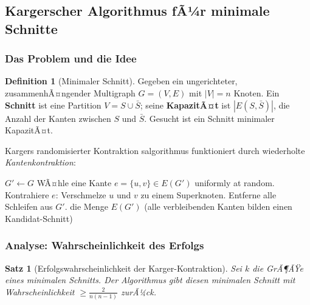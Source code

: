 ﻿\documentclass[12pt,a4paper]{article}
\theoremstyle{definition}
\newtheorem{definition}{Definition}[section]
\theoremstyle{plain}
\newtheorem{satz}{Satz}[section]
\theoremstyle{remark}
\begin{document}
\subsection{Kargerscher Algorithmus fÃ¼r minimale Schnitte}
\label{subsec:karger}

\subsubsection{Das Problem und die Idee}

\begin{definition}[Minimaler Schnitt]\label{def:mincut}
  Gegeben ein ungerichteter, zusammenhÃ¤ngender Multigraph $G=(V,E)$ mit
  $|V|=n$ Knoten. Ein \textbf{Schnitt} ist eine Partition $V = S \cup \bar{S}$;
  seine \textbf{KapazitÃ¤t} ist $|E(S,\bar{S})|$, die Anzahl der Kanten
  zwischen $S$ und $\bar{S}$. Gesucht ist ein Schnitt minimaler KapazitÃ¤t.
\end{definition}

Kargers randomisierter Kontraktion salgorithmus \cite{karger1993global}
funktioniert durch wiederholte \emph{Kantenkontraktion}:

\begin{algorithm}[H]
  \caption{Karger-Kontraktion}
  \label{alg:karger}
  \begin{algorithmic}[1]
    \State $G' \gets G$
      \State WÃ¤hle eine Kante $e = \{u,v\} \in E(G')$ uniformly at random.
      \State Kontrahiere $e$: Verschmelze $u$ und $v$ zu einem Superknoten.
      \State Entferne alle Schleifen aus $G'$.
    \EndWhile
    \State \Return die Menge $E(G')$ (alle verbleibenden Kanten bilden
           einen Kandidat-Schnitt)
  \end{algorithmic}
\end{algorithm}

\subsubsection{Analyse: Wahrscheinlichkeit des Erfolgs}

\begin{satz}[Erfolgswahrscheinlichkeit der Karger-Kontraktion]\label{satz:kargerprob}
  Sei $k$ die GrÃ¶ÃŸe eines minimalen Schnitts. Der Algorithmus gibt diesen
  minimalen Schnitt mit Wahrscheinlichkeit $\geq \frac{2}{n(n-1)}$ zurÃ¼ck.
\end{satz}
\end{document}
